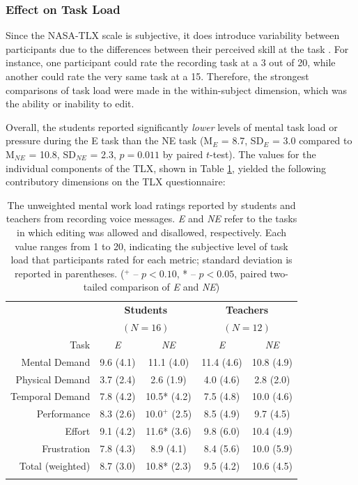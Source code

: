\subsubsection{Effect on Task Load}
Since the NASA-TLX scale is subjective, it does introduce variability between participants due to the differences between their perceived skill at the task \cite{nasatlx}. 
For instance, one participant could rate the recording task at a 3 out of 20, while another could rate the very same task at a 15.
Therefore, the strongest comparisons of task load were made in the within-subject dimension, which was the ability or inability to edit.

Overall, the students reported significantly \emph{lower} levels of mental task load or pressure during the E task than the NE task (M$_{E}$ = 8.7, SD$_{E}$ = 3.0 compared to M$_{NE}$ = 10.8, SD$_{NE}$ = 2.3, $p=0.011$ by paired $t$-test). 
The values for the individual components of the TLX, shown in Table \ref{tab:table1}, yielded the following contributory dimensions on the TLX questionnaire:

\begin{table}
	\centering
	\begin{tabular}{r c c c c}
		& \multicolumn{2}{c}{\textbf{Students}} & \multicolumn{2}{c}{\textbf{Teachers}}\\
		& \multicolumn{2}{c}{$(N=16)$} & \multicolumn{2}{c}{$(N=12)$}\\
		\toprule
		Task			& \textit{E} & \textit{NE} & \textit{E} & \textit{NE}\\
		Mental Demand   & 9.6 (4.1) & 11.1 (4.0) & 11.4 (4.6) & 10.8 (4.9) \\
		Physical Demand & 3.7 (2.4) & 2.6 (1.9) & 4.0 (4.6) & 2.8 (2.0) \\
		Temporal Demand & 7.8 (4.2) & 10.5* (4.2) & 7.5 (4.8) & 10.0 (4.6) \\
		Performance     & 8.3 (2.6) & $10.0^+$ (2.5) & 8.5 (4.9) & 9.7 (4.5) \\
		Effort          & 9.1 (4.2) & 11.6* (3.6) & 9.8 (6.0) & 10.4 (4.9) \\
		Frustration     & 7.8 (4.3) & 8.9 (4.1) & 8.4 (5.6) & 10.0 (5.9) \\
		\midrule
		Total (weighted)& 8.7 (3.0) & 10.8* (2.3) & 9.5 (4.2) & 10.6 (4.5) \\
		\bottomrule \\
	\end{tabular}
	\caption{The unweighted mental work load ratings reported by students and teachers from recording voice messages. \textit{E} and \textit{NE} refer to the tasks in which editing was allowed and disallowed, respectively. Each value ranges from 1 to 20, indicating the subjective level of task load that participants rated for each metric; standard deviation is reported in parentheses. ($^+$ -- $p<0.10$, * -- $p<0.05$, paired two-tailed comparison of \textit{E} and \textit{NE})}~\label{tab:table1}
\end{table}

